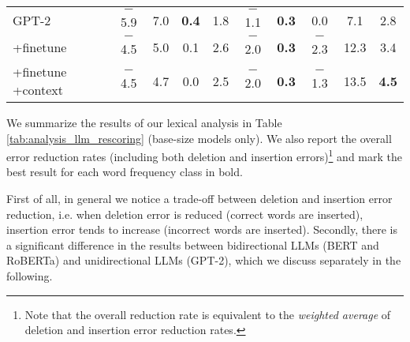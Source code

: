\documentclass[a4paper]{article}
\begin{document}
\begin{table*}[th]
{\begin{tabular}{lccccccccc}
\midrule
GPT-2 & $-$5.9 & 7.0 & \textbf{0.4} & 1.8 & $-$1.1 & \textbf{0.3} & 0.0 & 7.1 & 2.8 \\
\phantom{00}+finetune & $-$4.5 & 5.0 & 0.1 & 2.6 & $-$2.0 & \textbf{0.3} & $-$2.3 & 12.3 & 3.4 \\
\phantom{00}+finetune +context & $-$4.5 & 4.7 & 0.0 & 2.5 & $-$2.0 & \textbf{0.3} & $-$1.3 & 13.5 & \textbf{4.5} \\
\bottomrule[\heavyrulewidth]
\end{tabular}
}
\end{table*}

We summarize the results of our lexical analysis in Table \ref{tab:analysis_llm_rescoring} (base-size models only). We also report the overall error reduction rates (including both deletion and insertion errors)\footnote{Note that the overall reduction rate is equivalent to the \textit{weighted average} of deletion and insertion error reduction rates.} and mark the best result for each word frequency class in bold.


First of all, in general we notice a trade-off between deletion and insertion error reduction, i.e. when deletion error is reduced (correct words are inserted), insertion error tends to increase (incorrect words are inserted). Secondly, there is a significant difference in the results between bidirectional LLMs (BERT and RoBERTa) and unidirectional LLMs (GPT-2), which we discuss separately in the following.
\end{document}
